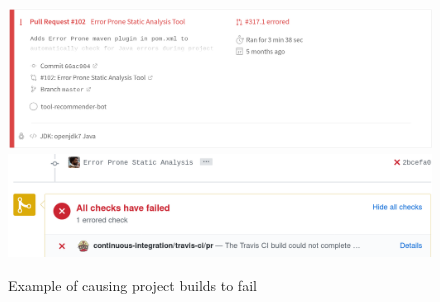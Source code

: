 \begin{figure}[H]
\centering
	\includegraphics[width=\textwidth]{Chapter-3/images/error.png}
	\includegraphics[width=\textwidth]{Chapter-3/images/error2.png}
	\caption{Example of \toolone causing project builds to fail}	
	\label{fig:error} 
\end{figure}